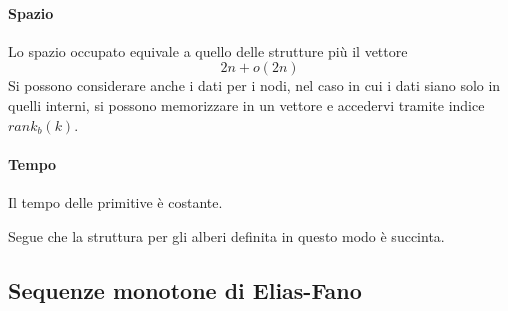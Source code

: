 \paragraph{Spazio}
Lo spazio occupato equivale a quello delle strutture più il vettore
 $$2n + o(2n)$$
Si possono considerare anche i dati per i nodi, nel caso in cui 
i dati siano solo in quelli interni, si possono memorizzare in un vettore 
e accedervi tramite indice $\mathit{rank}_b(k)$.

\paragraph{Tempo}
Il tempo delle primitive è costante.

Segue che la struttura per gli alberi definita in questo modo è succinta.

\subsection{Sequenze monotone di Elias-Fano}